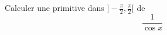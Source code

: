 Calculer une primitive dans $]-\frac{\pi}{2},\frac{\pi}{2}[$ de \[\frac{1}{\cos x}\] \bigskip\bigskip